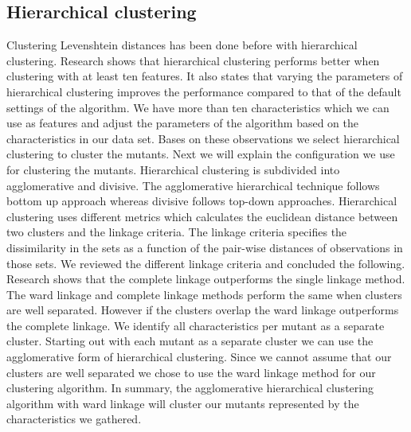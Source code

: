 \documentclass[../../main]{subfiles}
\begin{document}
\subsection{Hierarchical clustering}
Clustering Levenshtein distances has been done before with hierarchical clustering\cite{Rajalingam2011, Gothai2010PerformanceAlgorithms}. 
Research shows that hierarchical clustering performs better when clustering with at least ten features\cite{Rodriguez2019}.
It also states that varying the parameters of hierarchical clustering improves the performance compared to that of the default settings of the algorithm\cite{Rodriguez2019}.
We have more than ten characteristics which we can use as features and adjust the parameters of the algorithm based on the characteristics in our data set.
Bases on these observations we select hierarchical clustering to cluster the mutants.
Next we will explain the configuration we use for clustering the mutants. 
\newline
Hierarchical clustering is subdivided into agglomerative and divisive. 
The agglomerative hierarchical technique follows bottom up approach whereas divisive follows top-down approaches.
Hierarchical clustering uses different metrics which calculates the euclidean distance between two clusters and the linkage criteria\cite{Rajalingam2011}. 
The linkage criteria specifies the dissimilarity in the sets as a function of the pair-wise distances of observations in those sets\cite{Rajalingam2011}.
We reviewed the different linkage criteria and concluded the following.
\newline
Research shows that the complete linkage outperforms the single linkage method\cite{Vijaya2019ComparativeClustering}.
The ward linkage and complete linkage methods perform the same when clusters are well separated\cite{Vijaya2019ComparativeClustering}.
However if the clusters overlap the ward linkage outperforms the complete linkage\cite{Vijaya2019ComparativeClustering}.
\newline
We identify all characteristics per mutant as a separate cluster.
Starting out with each mutant as a separate cluster we can use the agglomerative form of hierarchical clustering.
Since we cannot assume that our clusters are well separated we chose to use the ward linkage method for our clustering algorithm.
In summary, the agglomerative hierarchical clustering algorithm with ward linkage will cluster our mutants represented by the characteristics we gathered.
\end{document}
